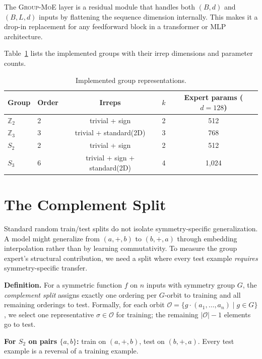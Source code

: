 \documentclass[10pt, letterpaper]{article}
\newcommand{\gmoe}{\textsc{Group-MoE}}
\begin{document}
The \gmoe{} layer is a residual module that handles both $(B, d)$ and $(B, L, d)$ inputs by flattening the sequence dimension internally. This makes it a drop-in replacement for any feedforward block in a transformer or MLP architecture.

Table~\ref{tab:groups} lists the implemented groups with their irrep dimensions and parameter counts.

\begin{table}[h]
\centering
\caption{Implemented group representations.}
\label{tab:groups}
\begin{tabular}{llccc}
\toprule
Group & Order & Irreps & $k$ & Expert params ($d{=}128$) \\
\midrule
$\mathbb{Z}_2$ & 2 & trivial + sign & 2 & 512 \\
$\mathbb{Z}_3$ & 3 & trivial + standard(2D) & 3 & 768 \\
$S_2$ & 2 & trivial + sign & 2 & 512 \\
$S_3$ & 6 & trivial + sign + standard(2D) & 4 & 1,024 \\
\bottomrule
\end{tabular}
\end{table}

\section{The Complement Split}
\label{sec:complement}

Standard random train/test splits do not isolate symmetry-specific generalization. A model might generalize from $(a, +, b)$ to $(b, +, a)$ through embedding interpolation rather than by learning commutativity. To measure the group expert's structural contribution, we need a split where every test example \emph{requires} symmetry-specific transfer.

\textbf{Definition.} For a symmetric function $f$ on $n$ inputs with symmetry group $G$, the \emph{complement split} assigns exactly one ordering per $G$-orbit to training and all remaining orderings to test. Formally, for each orbit $\mathcal{O} = \{g \cdot (a_1, \ldots, a_n) \mid g \in G\}$, we select one representative $\sigma \in \mathcal{O}$ for training; the remaining $|\mathcal{O}| - 1$ elements go to test.

\textbf{For $S_2$ on pairs $\{a, b\}$:} train on $(a, +, b)$, test on $(b, +, a)$. Every test example is a reversal of a training example.
\end{document}
